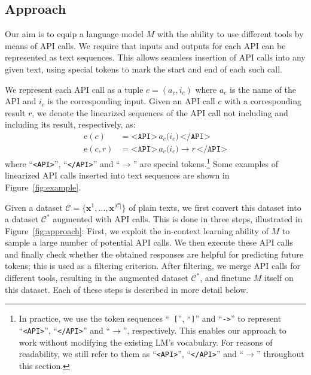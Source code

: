 \documentclass[11pt]{article}
\begin{document}
\begin{CJK*}{UTF8}{gbsn}
\section{Approach}
\label{section:approach}

Our aim is to equip a language model $M$ with the ability to use different tools by means of API calls. We require that inputs and outputs for each API can be represented as text sequences.
This allows seamless insertion of API calls into any given text, using special tokens to mark the start and end of each such call. 

We represent each API call as a tuple $c = ({a}_c, {i}_c)$ where $a_c$ is the name of the API and $i_c$ is the corresponding input. Given an API call $c$ with a corresponding result $r$, we denote the linearized sequences of the API call not including and including its result, respectively, as:
\begin{align*}
\text{e}(c)     & = \texttt{<API>}\, a_c \texttt{(} i_c \texttt{)}\, \texttt{</API>} \\
\text{e}(c, r)  & = \texttt{<API>}\, a_c \texttt{(} i_c \texttt{)} \rightarrow r\, \texttt{</API>}
\end{align*}
 where ``\texttt{<API>}'', ``\texttt{</API>}'' and ``$\rightarrow$'' are special tokens.\footnote{In practice, we use the token sequences ``\texttt{ [}'', ``\texttt{]}'' and ``\texttt{->}'' to represent ``\texttt{<API>}'', ``\texttt{</API>}'' and ``$\rightarrow$'', respectively. This enables our approach to work without modifying the existing LM's vocabulary. For reasons of readability, we still refer to them as ``\texttt{<API>}'', ``\texttt{</API>}'' and ``$\rightarrow$'' throughout this section.} Some examples of linearized API calls inserted into text sequences are shown in Figure~\ref{fig:example}.

Given a dataset $\mathcal{C} = \{ \mathbf{x}^1, \ldots, \mathbf{x}^{|\mathcal{C}|} \}$ of plain texts, we first convert this dataset into a dataset $\mathcal{C}^*$ augmented with API calls. This is done in three steps, illustrated in Figure~\ref{fig:approach}: First, we exploit the in-context learning ability of $M$ to sample a large number of potential API calls. We then execute these API calls and finally check whether the obtained responses are helpful for predicting future tokens; this is used as a filtering criterion. After filtering, we merge API calls for different tools, resulting in the augmented dataset $\mathcal{C}^*$, and finetune $M$ itself on this dataset. Each of these steps is described in more detail below.


\end{CJK*}
\end{document}
